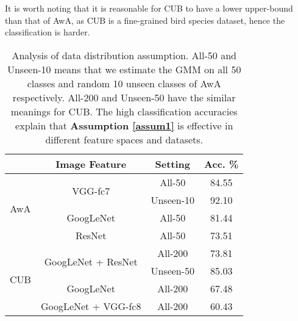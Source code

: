 \documentclass{article}
\begin{document}
It is worth noting that it is reasonable for CUB to have a lower upper-bound than that of AwA, as CUB is a fine-grained bird species dataset, hence the classification is harder.

\begin{table}[ht]
\centering

\begin{tabular}{c|c|c|c}
\hline
\multicolumn{1}{c|}{} & \multicolumn{1}{c|}{Image Feature} & \multicolumn{1}{c|}{Setting} & Acc. \% \\ \hline
\multirow{4}{*}{AwA}  & \multirow{2}{*}{VGG-fc7}       & All-50                       & 84.55       \\ \cline{3-4}
                      &                              & Unseen-10                    & 92.10       \\ \cline{2-4}
                      & GoogLeNet                    & All-50                       & 81.44       \\ \cline{2-4}
                      & ResNet                          & All-50                       & 73.51       \\ \hline
\multirow{4}{*}{CUB}  & \multirow{2}{*}{GoogLeNet + ResNet}           & All-200                       & 73.81       \\ \cline{3-4}
                      &                              & Unseen-50                    & 85.03       \\ \cline{2-4}
                      & {GoogLeNet}   & All-200                       & 67.48       \\ \cline{2-4}
                      & GoogLeNet + VGG-fc8           & All-200                       & 60.43       \\ \hline
\end{tabular}
\caption{Analysis of data distribution assumption. All-50 and Unseen-10 means that we estimate the GMM on all 50 classes and random 10 unseen classes of AwA respectively. All-200 and Unseen-50 have the similar meanings for CUB. The high classification accuracies explain that \textbf{Assumption \ref{assum1}} is effective in different feature spaces and datasets.}
\label{tab:assum1}
\end{table}
\end{document}
